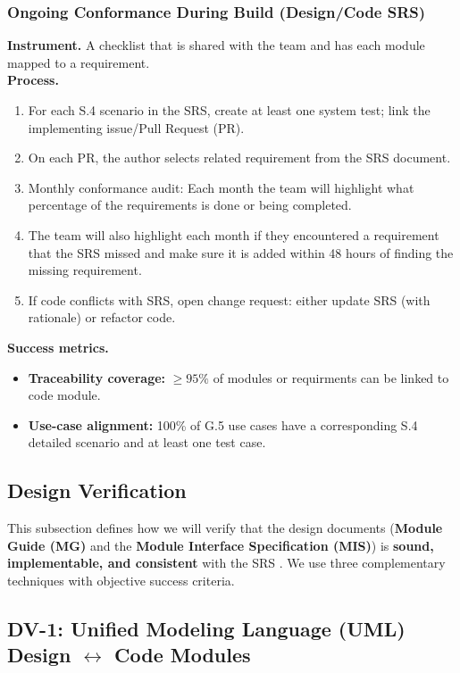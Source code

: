 \documentclass[12pt, titlepage]{article}
\begin{document}
\subsubsection*{Ongoing Conformance During Build (Design/Code \textrightarrow{} SRS)}
\textbf{Instrument.} A checklist that is shared with the team and has each module mapped to a requirement. \\
\textbf{Process.}
\begin{enumerate}
  \item For each S.4 scenario in the SRS, create at least one system test; link the implementing issue/Pull Request (PR).
  \item On each PR, the author selects related requirement from the SRS document.
  \item Monthly conformance audit: Each month the team will highlight what percentage of the requirements is done or being completed.
  \item The team will also highlight each month if they encountered a requirement that the SRS missed and make sure it is added within 48 hours of finding the missing requirement.
  \item If code conflicts with SRS, open change request: either update SRS (with rationale) or refactor code.
\end{enumerate}
\textbf{Success metrics.}
\begin{itemize}
  \item \textbf{Traceability coverage:} $\geq 95\%$ of modules or requirments can be linked to code module.
  \item \textbf{Use-case alignment:} 100\% of G.5 use cases have a corresponding S.4 detailed scenario and at least one test case.
\end{itemize}


\subsection{Design Verification}

This subsection defines how we will verify that the design documents (\textbf{Module Guide (MG)} and the \textbf{Module Interface Specification (MIS)}) is
\textbf{sound, implementable, and consistent} with the SRS \citep{DesignDocs,SRS-Sanskrit-Ciphers}. We use three complementary techniques with objective
success criteria.

\subsection*{DV-1: Unified Modeling Language (UML) Design \texorpdfstring{$\leftrightarrow$}{↔} Code Modules}
\end{document}
